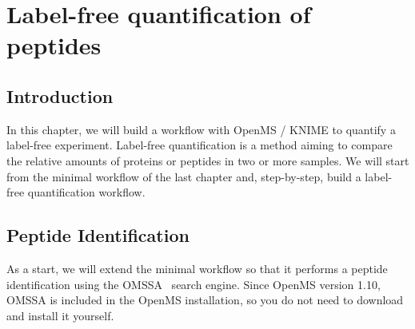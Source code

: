 

\newpage
\section{Label-free quantification of peptides}
\label{sec:lfq}

\subsection{Introduction}

In this chapter, we will build a workflow with OpenMS / KNIME to quantify a label-free experiment. 
Label-free quantification is a method aiming to compare the relative amounts of proteins or peptides in two or more samples.
We will start from the minimal workflow of the last chapter and, step-by-step, build a label-free quantification workflow.

\subsection{Peptide Identification}
\label{Peptide_Identification}

As a start, we will extend the minimal workflow so that it performs a peptide identification using the OMSSA~\cite{Geer:2004p285} search engine. Since OpenMS version 1.10, OMSSA is included in the OpenMS installation, so you do not need to download and install it yourself.

